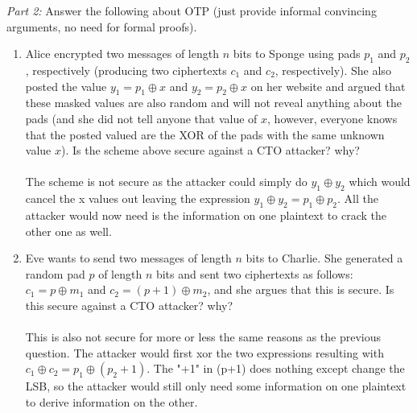 \documentclass[12pt]{article}
\begin{document}
\noindent\emph{Part 2:} Answer the following about OTP (just provide informal convincing arguments, no need for formal proofs).
\begin{enumerate}
\item Alice encrypted two messages of length $n$ bits to Sponge using pads $p_1$ and $p_2$, respectively (producing two ciphertexts $c_1$ and $c_2$, respectively). She also posted the value $y_1 = p_1 \oplus x$ and $y_2 = p_2 \oplus x$ on her website and argued that these masked values are also random and will not reveal anything about the pads (and she did not tell anyone that value of $x$, however, everyone knows that the posted valued are the XOR of the pads with the same unknown value $x$). Is the scheme above secure against a CTO attacker? why?
\\\\The scheme is not secure as the attacker could simply do \(y_1 \oplus y_2\) which would cancel the x values out leaving 
the expression \(y_1 \oplus y_2 = p_1 \oplus p_2\). All the attacker would now need is the information on one plaintext to crack
the other one as well. 
\item Eve wants to send two messages of length $n$ bits to Charlie. She generated a random pad $p$ of length $n$ bits and sent two ciphertexts as follows: $c_1 = p \oplus m_1$ and $c_2 = (p+1) \oplus m_2$, and she argues that this is secure. Is this secure against a CTO attacker? why?
\\\\This is also not secure for more or less the same reasons as the previous question. The attacker would first xor the 
two expressions resulting with \(c_1 \oplus c_2 = p_1 \oplus (p_2+1)\). The "+1" in (p+1) does nothing except change the LSB,
so the attacker would still only need some information on one plaintext to derive information on the other.  
\end{enumerate}


\end{document}
